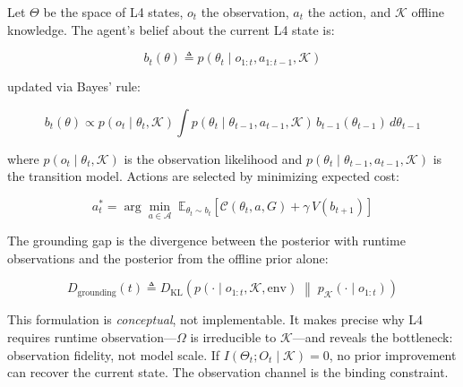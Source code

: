 Let \(\Theta\) be the space of L4 states, \(o_t\) the observation, \(a_t\) the action, and \(\mathcal{K}\) offline knowledge. The agent's belief about the current L4 state is:

\begin{equation}
b_t(\theta) \triangleq p(\theta_t \mid o_{1:t}, a_{1:t-1}, \mathcal{K})
\end{equation}

updated via Bayes' rule:

\begin{equation}
b_t(\theta) \propto p(o_t \mid \theta_t, \mathcal{K}) \int p(\theta_t \mid \theta_{t-1}, a_{t-1}, \mathcal{K}) \, b_{t-1}(\theta_{t-1}) \, d\theta_{t-1}
\end{equation}

where \(p(o_t \mid \theta_t, \mathcal{K})\) is the observation likelihood and \(p(\theta_t \mid \theta_{t-1}, a_{t-1}, \mathcal{K})\) is the transition model. Actions are selected by minimizing expected cost:

\begin{equation}
a_t^* = \arg\min_{a \in \mathcal{A}} \; \mathbb{E}_{\theta_t \sim b_t}\left[ \mathcal{C}(\theta_t, a, G) + \gamma \, V(b_{t+1}) \right]
\end{equation}

The grounding gap is the divergence between the posterior with runtime observations and the posterior from the offline prior alone:

\begin{equation}
D_{\text{grounding}}(t) \triangleq D_{\text{KL}}\left(p(\cdot \mid o_{1:t}, \mathcal{K}, \text{env}) \;\middle\|\; p_{\mathcal{K}}(\cdot \mid o_{1:t})\right)
\end{equation}

This formulation is \emph{conceptual}, not implementable. It makes precise why L4 requires runtime observation---\(\Omega\) is irreducible to \(\mathcal{K}\)---and reveals the bottleneck: observation fidelity, not model scale. If \(I(\Theta_t; O_t \mid \mathcal{K}) = 0\), no prior improvement can recover the current state. The observation channel is the binding constraint.

